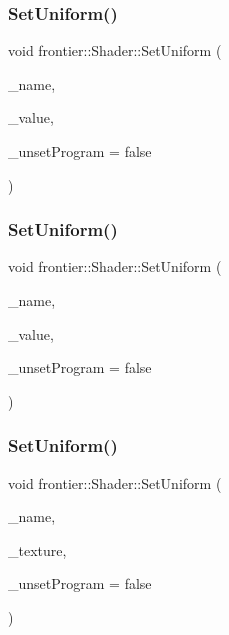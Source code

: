 \mbox{\label{classfrontier_1_1_shader_ae893f9f790c70ef2abaa0f1ba58bfec1}} 
\subsubsection{\texorpdfstring{Set\+Uniform()}{SetUniform()}\hspace{0.1cm}{\footnotesize\ttfamily [1/8]}}
{\footnotesize\ttfamily void frontier\+::\+Shader\+::\+Set\+Uniform (\begin{DoxyParamCaption}\item[{const G\+Lchar $\ast$}]{\+\_\+name,  }\item[{float}]{\+\_\+value,  }\item[{bool}]{\+\_\+unset\+Program = {\ttfamily false} }\end{DoxyParamCaption})}

\mbox{\label{classfrontier_1_1_shader_ae11b17bf3cc75186024f9a058cf06cb7}} 
\subsubsection{\texorpdfstring{Set\+Uniform()}{SetUniform()}\hspace{0.1cm}{\footnotesize\ttfamily [2/8]}}
{\footnotesize\ttfamily void frontier\+::\+Shader\+::\+Set\+Uniform (\begin{DoxyParamCaption}\item[{const G\+Lchar $\ast$}]{\+\_\+name,  }\item[{int}]{\+\_\+value,  }\item[{bool}]{\+\_\+unset\+Program = {\ttfamily false} }\end{DoxyParamCaption})}

\mbox{\label{classfrontier_1_1_shader_ad9bb90b3f092c6925293cee5013c9400}} 
\subsubsection{\texorpdfstring{Set\+Uniform()}{SetUniform()}\hspace{0.1cm}{\footnotesize\ttfamily [3/8]}}
{\footnotesize\ttfamily void frontier\+::\+Shader\+::\+Set\+Uniform (\begin{DoxyParamCaption}\item[{const G\+Lchar $\ast$}]{\+\_\+name,  }\item[{std\+::weak\+\_\+ptr$<$ \hyperlink{classfrontier_1_1_texture}{Texture} $>$}]{\+\_\+texture,  }\item[{bool}]{\+\_\+unset\+Program = {\ttfamily false} }\end{DoxyParamCaption})}


